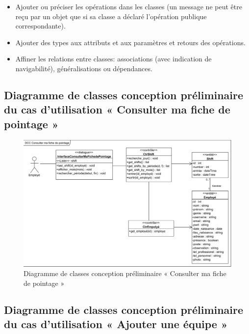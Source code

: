 \begin{itemize}
    \item [\textbullet] Ajouter ou préciser les opérations dans les classes 
        (un message ne peut être reçu par un objet que si sa classe a déclaré 
        l’opération publique correspondante).
    \item [\textbullet] Ajouter des types aux attributs et aux paramètres et 
        retours des opérations. 
    \item [\textbullet] Affiner les relations entre classes: associations 
        (avec indication de navigabilité), généralisations ou dépendances.\cite{5}
\end{itemize}
    
\clearpage

\subsection*{Diagramme de classes conception préliminaire du cas d'utilisation « Consulter ma fiche de pointage »}

\begin{figure}[h!]
    \centering
    \includegraphics[scale=0.77]{images/DCC/DCC Consulter ma fiche de pointage.png}
    \caption{Diagramme de classes conception préliminaire « Consulter ma fiche de pointage »}
    \label{fig42}
\end{figure}
        
\subsection*{Diagramme de classes conception préliminaire du cas d'utilisation « Ajouter une équipe »}

\clearpage

